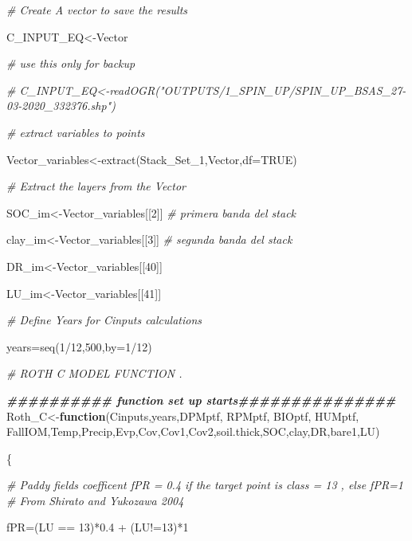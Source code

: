\documentclass[
  10pt,
  b5paper,
]{book}
\newenvironment{Shaded}{\begin{snugshade}}{\end{snugshade}}
\newcommand{\AttributeTok}[1]{\textcolor[rgb]{0.77,0.63,0.00}{#1}}
\newcommand{\CommentTok}[1]{\textcolor[rgb]{0.56,0.35,0.01}{\textit{#1}}}
\newcommand{\ConstantTok}[1]{\textcolor[rgb]{0.00,0.00,0.00}{#1}}
\newcommand{\ControlFlowTok}[1]{\textcolor[rgb]{0.13,0.29,0.53}{\textbf{#1}}}
\newcommand{\DecValTok}[1]{\textcolor[rgb]{0.00,0.00,0.81}{#1}}
\newcommand{\DocumentationTok}[1]{\textcolor[rgb]{0.56,0.35,0.01}{\textbf{\textit{#1}}}}
\newcommand{\FloatTok}[1]{\textcolor[rgb]{0.00,0.00,0.81}{#1}}
\newcommand{\FunctionTok}[1]{\textcolor[rgb]{0.00,0.00,0.00}{#1}}
\newcommand{\NormalTok}[1]{#1}
\newcommand{\OtherTok}[1]{\textcolor[rgb]{0.56,0.35,0.01}{#1}}
\newcommand{\SpecialCharTok}[1]{\textcolor[rgb]{0.00,0.00,0.00}{#1}}
\begin{document}
\begin{Shaded}
\begin{Highlighting}[]
\CommentTok{\# Create A vector to save the results}

\NormalTok{C\_INPUT\_EQ}\OtherTok{\textless{}{-}}\NormalTok{Vector}

\CommentTok{\# use this only for backup}

\CommentTok{\# C\_INPUT\_EQ\textless{}{-}readOGR("OUTPUTS/1\_SPIN\_UP/SPIN\_UP\_BSAS\_27{-}03{-}2020\_332376.shp")}

\CommentTok{\# extract variables to points}

\NormalTok{Vector\_variables}\OtherTok{\textless{}{-}}\FunctionTok{extract}\NormalTok{(Stack\_Set\_1,Vector,}\AttributeTok{df=}\ConstantTok{TRUE}\NormalTok{)}

\CommentTok{\# Extract the layers from the Vector}

\NormalTok{SOC\_im}\OtherTok{\textless{}{-}}\NormalTok{Vector\_variables[[}\DecValTok{2}\NormalTok{]] }\CommentTok{\# primera banda del stack}

\NormalTok{clay\_im}\OtherTok{\textless{}{-}}\NormalTok{Vector\_variables[[}\DecValTok{3}\NormalTok{]] }\CommentTok{\# segunda banda del stack }

\NormalTok{DR\_im}\OtherTok{\textless{}{-}}\NormalTok{Vector\_variables[[}\DecValTok{40}\NormalTok{]]}

\NormalTok{LU\_im}\OtherTok{\textless{}{-}}\NormalTok{Vector\_variables[[}\DecValTok{41}\NormalTok{]]}

\CommentTok{\# Define Years for Cinputs calculations}

\NormalTok{years}\OtherTok{=}\FunctionTok{seq}\NormalTok{(}\DecValTok{1}\SpecialCharTok{/}\DecValTok{12}\NormalTok{,}\DecValTok{500}\NormalTok{,}\AttributeTok{by=}\DecValTok{1}\SpecialCharTok{/}\DecValTok{12}\NormalTok{)}

\CommentTok{\# ROTH C MODEL FUNCTION . }

\DocumentationTok{\#\#\#\#\#\#\#\#\#\# function set up starts\#\#\#\#\#\#\#\#\#\#\#\#\#\#\#}
\NormalTok{Roth\_C}\OtherTok{\textless{}{-}}\ControlFlowTok{function}\NormalTok{(Cinputs,years,DPMptf, RPMptf, BIOptf, HUMptf, FallIOM,Temp,Precip,Evp,Cov,Cov1,Cov2,soil.thick,SOC,clay,DR,bare1,LU)}

\NormalTok{\{}

\CommentTok{\# Paddy fields coefficent fPR = 0.4 if the target point is class = 13 , else fPR=1}
\CommentTok{\# From Shirato and Yukozawa 2004}

\NormalTok{fPR}\OtherTok{=}\NormalTok{(LU }\SpecialCharTok{==} \DecValTok{13}\NormalTok{)}\SpecialCharTok{*}\FloatTok{0.4} \SpecialCharTok{+}\NormalTok{ (LU}\SpecialCharTok{!=}\DecValTok{13}\NormalTok{)}\SpecialCharTok{*}\DecValTok{1}


\end{Highlighting}
\end{Shaded}
\end{document}
